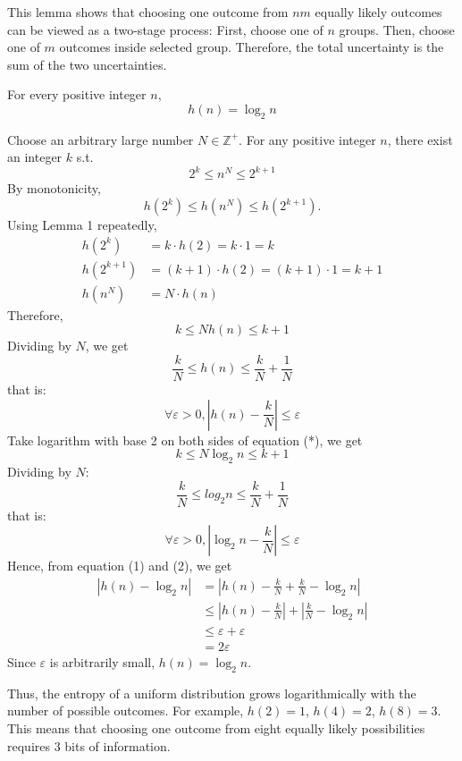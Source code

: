 \documentclass[11pt]{report}
\theoremstyle{lecturedefinition}
\theoremstyle{lectureremark}
\begin{document}
This lemma shows that choosing one outcome from $nm$ equally likely outcomes can be viewed as a two-stage process: First, choose one of $n$ groups. Then, choose one of $m$ outcomes inside selected group. Therefore, the total uncertainty is the sum of the two uncertainties.

\begin{lemma}
For every positive integer $n$,
\[
h(n)=\log_2 n
\]
\vspace{-0.8em}
\vspace{-1.2em}
\tcblower

Choose an arbitrary large number $N\in\mathbb{Z}^+$. For any positive integer $n$, there exist an integer $k$ s.t.
\[
2^k\le n^N\le 2^{k+1}\tag{*}
\]
By monotonicity,
\[
h(2^k)\le h(n^N)\le h(2^{k+1}).
\]
Using Lemma 1 repeatedly,
\begin{equation*}
\begin{aligned}
h(2^k)&=k\cdot h(2)=k\cdot 1 = k\\
h(2^{k+1})&=(k+1)\cdot h(2)=(k+1)\cdot 1=k+1 \\
h(n^N)&=N\cdot h(n)
\end{aligned}
\end{equation*}
Therefore,
\[
k\le Nh(n)\le k+1
\]
Dividing by $N$, we get
\[
\frac{k}{N}\le h(n)\le \frac{k}{N}+\frac{1}{N}
\]
that is:
\[
\forall \varepsilon>0,\left|h(n)-\frac{k}{N}\right|\le \varepsilon\tag{1}
\]
Take logarithm with base 2 on both sides of equation (*), we get
\[
k\le N\log_2 n\le k+1
\]
Dividing by $N$:
\[
\frac{k}{N}\le log_2 n\le \frac{k}{N}+\frac{1}{N}
\]
that is:
\[
\forall \varepsilon>0,\left|\log_2 n-\frac{k}{N}\right|\le \varepsilon\tag{2}
\]
Hence, from equation (1) and (2), we get
\begin{equation*}
\begin{aligned}
\left|h(n)-\log_2 n\right|&=\left|h(n)-\frac{k}{N}+\frac{k}{N}-\log_2 n\right|\\
&\le\left|h(n)-\frac{k}{N}\right|+\left|\frac{k}{N}-\log_2 n\right|\\
&\le \varepsilon+\varepsilon\\
&=2\varepsilon
\end{aligned}
\end{equation*}
Since $\varepsilon$ is arbitrarily small, $h(n)=\log_2 n$.
\end{lemma}

Thus, the entropy of a uniform distribution grows logarithmically with the number of possible outcomes. For example, $h(2)=1$, $h(4)=2$, $h(8)=3$. This means that choosing one outcome from eight equally likely possibilities requires 3 bits of information.
\end{document}
